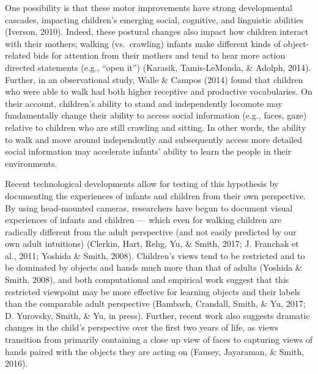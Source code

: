 \documentclass[10pt, letterpaper]{article}
\begin{document}
One possibility is that these motor improvements have strong
developmental cascades, impacting children's emerging social, cognitive,
and linguistic abilities (Iverson, 2010). Indeed, these postural changes
also impact how children interact with their mothers; walking
(vs.~crawling) infants make different kinds of object-related bids for
attention from their mothers and tend to hear more action directed
statements (e.g., ``open it'') (Karasik, Tamis-LeMonda, \& Adolph,
2014). Further, in an observational study, Walle \& Campos (2014) found
that children who were able to walk had both higher receptive and
productive vocabularies. On their account, children's ability to stand
and independently locomote may fundamentally change their ability to
access social information (e.g., faces, gaze) relative to children who
are still crawling and sitting. In other words, the ability to walk and
move around independently and subsequently access more detailed social
information may accelerate infants' ability to learn the people in their
environments.

Recent technological developments allow for testing of this hypothesis
by documenting the experiences of infants and children from their own
perspective. By using head-mounted cameras, researchers have begun to
document visual experiences of infants and children --- which even for
walking children are radically different from the adult perspective (and
not easily predicted by our own adult intuitions) (Clerkin, Hart, Rehg,
Yu, \& Smith, 2017; J. Franchak et al., 2011; Yoshida \& Smith, 2008).
Children's views tend to be restricted and to be dominated by objects
and hands much more than that of adults (Yoshida \& Smith, 2008), and
both computational and empirical work suggest that this restricted
viewpoint may be more effective for learning objects and their labels
than the comparable adult perspective (Bambach, Crandall, Smith, \& Yu,
2017; D. Yurovsky, Smith, \& Yu, in press). Further, recent work also
suggests dramatic changes in the child's perspective over the first two
years of life, as views transition from primarily containing a close up
view of faces to capturing views of hands paired with the objects they
are acting on (Fausey, Jayaraman, \& Smith, 2016).
\end{document}
